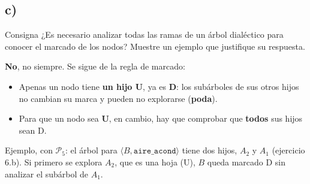 \documentclass[11pt,a4paper]{article}
\begin{document}
\begin{center}
\begin{minipage}{\linewidth}
\centering
{}
\end{minipage}
\end{center}

\subsection{c)}

\begin{enunciado}{Consigna}
¿Es necesario analizar todas las ramas de un árbol dialéctico para conocer el marcado de los nodos? Muestre un ejemplo que justifique su respuesta.
\end{enunciado}

\textbf{No}, no siempre. Se sigue de la regla de marcado:
\begin{itemize}
  \item Apenas un nodo tiene \textbf{un hijo U}, ya es \textbf{D}: los subárboles de sus otros hijos no cambian su marca y pueden no explorarse (\textbf{poda}).
  \item Para que un nodo sea \textbf{U}, en cambio, hay que comprobar que \textbf{todos} sus hijos sean D.
\end{itemize}

Ejemplo, con $\mathcal{P}_5$: el árbol para $\langle B, \texttt{aire\_acond}\rangle$ tiene dos hijos, $A_2$ y $A_1$ (ejercicio 6.b). Si primero se explora $A_2$, que es una hoja (U), $B$ queda marcado D sin analizar el subárbol de $A_1$.
\end{document}
